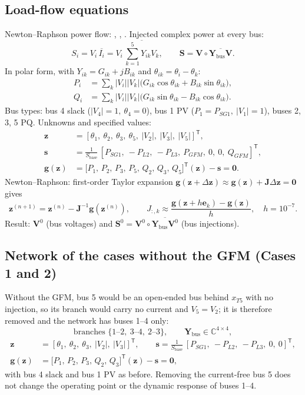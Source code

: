 \documentclass[11pt,a4paper]{article}
\numberwithin{equation}{section}
\newcommand{\cj}[1]{\overline{#1}}
\begin{document}
\subsection{Load-flow equations}
Newton--Raphson power flow: \cite{TinneyHart1967}, \cite{BergenVittal2000}, \cite{KothariNagrath2011}.
Injected complex power at every bus:
\begin{equation}
S_i = V_i\,\cj{I_i} = V_i\,\cj{\textstyle\sum_{k=1}^{5} Y_{ik}V_k},
\qquad
\bm S = \bm V \circ \cj{\bm Y_{\text{bus}}\bm V}.
\end{equation}
In polar form, with $Y_{ik}=G_{ik}+jB_{ik}$ and $\theta_{ik}=\theta_i-\theta_k$:
\begin{align}
P_i &= \sum_{k} |V_i||V_k|\big(G_{ik}\cos\theta_{ik} + B_{ik}\sin\theta_{ik}\big),\\
Q_i &= \sum_{k} |V_i||V_k|\big(G_{ik}\sin\theta_{ik} - B_{ik}\cos\theta_{ik}\big).
\end{align}
Bus types: bus 4 slack ($|V_4|=1,\ \theta_4=0$), bus 1 PV ($P_1=P_{SG1},\ |V_1|=1$), buses 2, 3, 5 PQ.
Unknowns and specified values:
\begin{align}
\bm z &= [\theta_1,\ \theta_2,\ \theta_3,\ \theta_5,\ |V_2|,\ |V_3|,\ |V_5|]^{\mathsf T},\\
\bm s &= \frac{1}{S_{\text{base}}}\,[P_{SG1},\ -P_{L2},\ -P_{L3},\ P_{GFM},\ 0,\ 0,\ Q_{GFM}]^{\mathsf T},\\
\bm g(\bm z) &= \big[P_1,\,P_2,\,P_3,\,P_5,\,Q_2,\,Q_3,\,Q_5\big]^{\mathsf T}(\bm z) - \bm s = \bm 0 .
\end{align}
Newton--Raphson: first-order Taylor expansion $\bm g(\bm z+\Delta\bm z)\approx \bm g(\bm z)+\bm J\Delta\bm z = \bm 0$ gives
\begin{equation}
\bm z^{(n+1)} = \bm z^{(n)} - \bm J^{-1}\bm g(\bm z^{(n)}),
\qquad
J_{:,k} \approx \frac{\bm g(\bm z + h\bm e_k) - \bm g(\bm z)}{h},\quad h=10^{-7}.
\end{equation}
Result: $\bm V^0$ (bus voltages) and $\bm S^0 = \bm V^0\circ\cj{\bm Y_{\text{bus}}\bm V^0}$ (bus injections).

\subsection{Network of the cases without the GFM (Cases 1 and 2)}\label{sec:4bus}
Without the GFM, bus 5 would be an open-ended bus behind $x_{T5}$ with no injection, so its branch would carry no current and $V_5 = V_2$; it is therefore removed and the network has buses 1--4 only:
\begin{equation}
\text{branches } \{1\text{--}2,\ 3\text{--}4,\ 2\text{--}3\},\qquad \bm Y_{\text{bus}}\in\mathbb C^{4\times 4},
\end{equation}
\begin{align}
\bm z &= [\theta_1,\ \theta_2,\ \theta_3,\ |V_2|,\ |V_3|]^{\mathsf T},\qquad
\bm s = \frac{1}{S_{\text{base}}}\,[P_{SG1},\ -P_{L2},\ -P_{L3},\ 0,\ 0]^{\mathsf T},\\
\bm g(\bm z) &= \big[P_1,\,P_2,\,P_3,\,Q_2,\,Q_3\big]^{\mathsf T}(\bm z) - \bm s = \bm 0,
\end{align}
with bus 4 slack and bus 1 PV as before. Removing the current-free bus 5 does not change the operating point or the dynamic response of buses 1--4.
\end{document}
